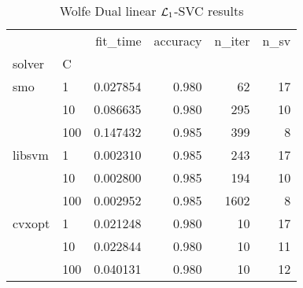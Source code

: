 \begin{table}[H]
\centering
\caption{Wolfe Dual linear $\protect \mathcal{L}_1$-SVC results}
\label{linear_dual_l1_svc_cv_results}
\begin{tabular}{llrrrr}
\toprule
       &     &  fit\_time &  accuracy &  n\_iter &  n\_sv \\
solver & C &           &           &         &       \\
\midrule
smo & 1   &  0.027854 &     0.980 &      62 &    17 \\
       & 10  &  0.086635 &     0.980 &     295 &    10 \\
       & 100 &  0.147432 &     0.985 &     399 &     8 \\
libsvm & 1   &  0.002310 &     0.985 &     243 &    17 \\
       & 10  &  0.002800 &     0.985 &     194 &    10 \\
       & 100 &  0.002952 &     0.985 &    1602 &     8 \\
cvxopt & 1   &  0.021248 &     0.980 &      10 &    17 \\
       & 10  &  0.022844 &     0.980 &      10 &    11 \\
       & 100 &  0.040131 &     0.980 &      10 &    12 \\
\bottomrule
\end{tabular}
\end{table}

